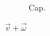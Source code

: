 \documentclass{svjour2}
\begin{document}
\begin{figure}\caption{Cap.}\end{figure}
$\vec{v}+\vec{\omega}$
\end{document}
